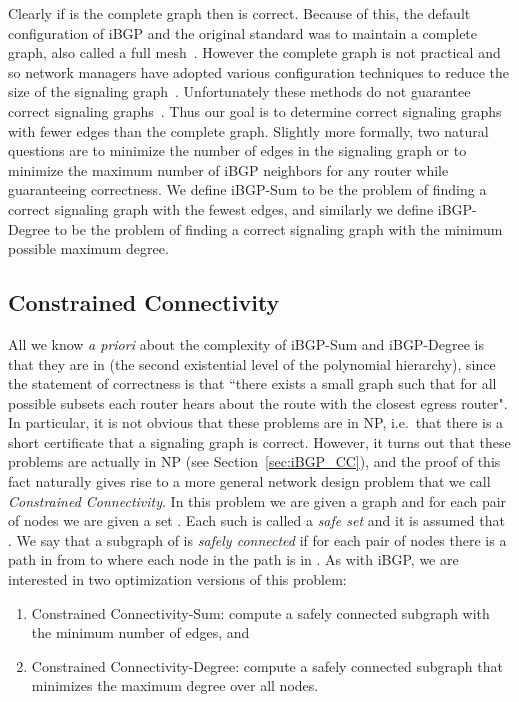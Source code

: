 \documentclass[11pt,letterpaper]{article}
\theoremstyle{definition}
\begin{document}
Clearly if  is the complete graph then  is correct.  Because of this, the default configuration of iBGP and the original standard was to maintain a complete graph, also called a full mesh~\cite{stewart:99}.
However the complete graph is not practical and so network managers have
adopted various configuration techniques to reduce the size of the signaling
graph~\cite{rfc:2796,rfc:3065}.
Unfortunately these methods do not guarantee correct signaling
graphs~\cite{basu,griffinwilfong:2002a}.
Thus our goal is to determine correct signaling graphs with fewer
edges than the complete graph.  Slightly more formally, two natural questions are to minimize the number of edges in the signaling
graph or to minimize the maximum number of iBGP neighbors for any router
while guaranteeing correctness.
We define {\sc iBGP-Sum} to be the problem of finding
a correct signaling graph with the fewest edges, and similarly we define {\sc iBGP-Degree} to be the problem of finding
a correct signaling graph with the minimum possible maximum degree.

\subsection{Constrained Connectivity}
All we know \emph{a priori} about the complexity of {\sc iBGP-Sum} and {\sc iBGP-Degree} is that they are in  (the second existential level of the polynomial hierarchy), since the statement of correctness is that ``there exists a small graph  such that for all possible subsets   each router hears about the route with the closest egress router".  In particular, it is not obvious that these problems are in NP, i.e.~that there is a short certificate that a signaling graph is correct.  However, it turns out that these problems are actually in NP (see Section~\ref{sec:iBGP_CC}), and the proof of this fact naturally gives rise to a more general network design problem that we call \emph{Constrained Connectivity}.  In this problem we are given a graph  and for each pair of nodes  we are given a set .
Each such  is called a {\em safe set} and it is assumed that
.  We say that a subgraph 
of  is {\em safely connected} if for each pair of nodes  there
is a path in  from  to  where each node in the path is in .  As with iBGP, we are interested in two optimization versions of this problem:
\begin{enumerate}
\item {\sc Constrained Connectivity-Sum}: compute a safely
connected subgraph  with the minimum number of edges, and
\item {\sc Constrained Connectivity-Degree}: compute a safely
connected subgraph  that minimizes the maximum degree over all nodes.
\end{enumerate}
\end{document}
